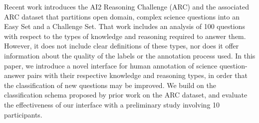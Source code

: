 Recent work introduces the AI2 Reasoning Challenge (ARC) and the associated ARC dataset that partitions open domain, complex science questions into an Easy Set and a Challenge Set. That work includes an analysis of 100 questions with respect to the types of knowledge and reasoning required to answer them. However, it does not include clear definitions of these types, nor does it offer information about the quality of the labels or the annotation process used. In this paper, we introduce a novel interface for human annotation of science question-answer pairs with their respective knowledge and reasoning types, in order that the classification of new questions may be improved. We build on the classification schema proposed by prior work on the ARC dataset, and evaluate the effectiveness of our interface with a preliminary study involving 10 participants.
